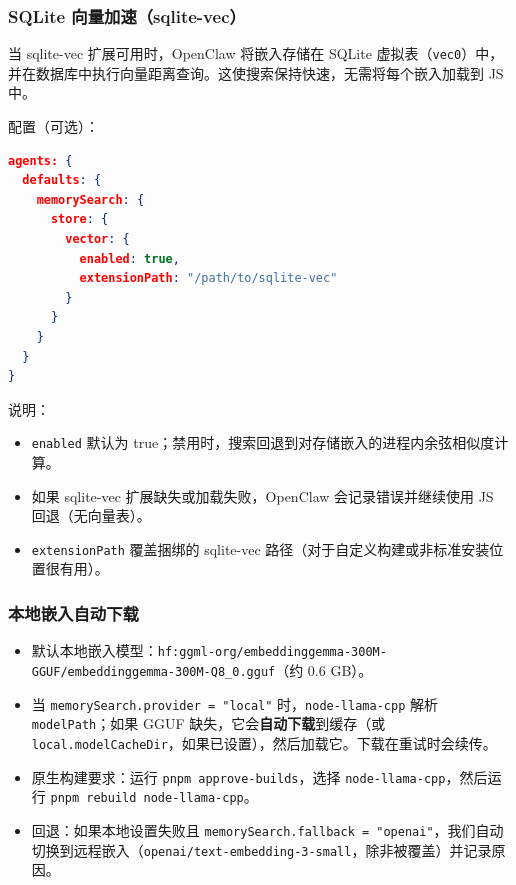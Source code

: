 \subsubsection{SQLite 向量加速（sqlite-vec）}


当 sqlite-vec 扩展可用时，OpenClaw 将嵌入存储在 SQLite 虚拟表（\texttt{vec0}）中，并在数据库中执行向量距离查询。这使搜索保持快速，无需将每个嵌入加载到 JS 中。

配置（可选）：

\begin{lstlisting}[language=json]
agents: {
  defaults: {
    memorySearch: {
      store: {
        vector: {
          enabled: true,
          extensionPath: "/path/to/sqlite-vec"
        }
      }
    }
  }
}
\end{lstlisting}


说明：

\begin{itemize}
  \item \texttt{enabled} 默认为 true；禁用时，搜索回退到对存储嵌入的进程内余弦相似度计算。
  \item 如果 sqlite-vec 扩展缺失或加载失败，OpenClaw 会记录错误并继续使用 JS 回退（无向量表）。
  \item \texttt{extensionPath} 覆盖捆绑的 sqlite-vec 路径（对于自定义构建或非标准安装位置很有用）。
\end{itemize}


\subsubsection{本地嵌入自动下载}


\begin{itemize}
  \item 默认本地嵌入模型：\texttt{hf:ggml-org/embeddinggemma-300M-GGUF/embeddinggemma-300M-Q8\_0.gguf}（约 0.6 GB）。
  \item 当 \texttt{memorySearch.provider = "local"} 时，\texttt{node-llama-cpp} 解析 \texttt{modelPath}；如果 GGUF 缺失，它会\textbf{自动下载}到缓存（或 \texttt{local.modelCacheDir}，如果已设置），然后加载它。下载在重试时会续传。
  \item 原生构建要求：运行 \texttt{pnpm approve-builds}，选择 \texttt{node-llama-cpp}，然后运行 \texttt{pnpm rebuild node-llama-cpp}。
  \item 回退：如果本地设置失败且 \texttt{memorySearch.fallback = "openai"}，我们自动切换到远程嵌入（\texttt{openai/text-embedding-3-small}，除非被覆盖）并记录原因。
\end{itemize}


